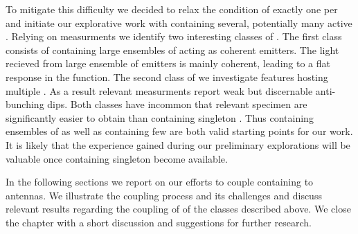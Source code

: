 		To mitigate this difficulty we decided to relax the condition of exactly one \siv per \nd and initiate our explorative work with \nds containing several, potentially many active \sivs. Relying on \gtz measurments we identify two interesting classes of \nds. The first class consists of \nds containing large ensembles of \sivs acting as coherent emitters. The \fl light recieved from large ensemble of emitters is mainly coherent, leading to a flat response in the \gtz function. The second class of \nds we investigate features \nds hosting multiple \sivs. As a result relevant \gtz measurments report weak but discernable anti-bunching dips. Both classes have incommon that relevant \nd specimen are significantly easier to obtain than \nds containing singleton \sivs. Thus \nds containing ensembles of \sivs as well as \nds containing few \sivs are both valid starting points for our work. It is likely that the experience gained during our preliminary explorations will be valuable once \nds containing singleton \sivs become available.

		In the following sections we report on our efforts to couple \nds containing \sivs to antennas. We illustrate the coupling process and its challenges and discuss relevant results regarding the coupling of \nds of the classes described above. We close the chapter with a short discussion and suggestions for further research.



